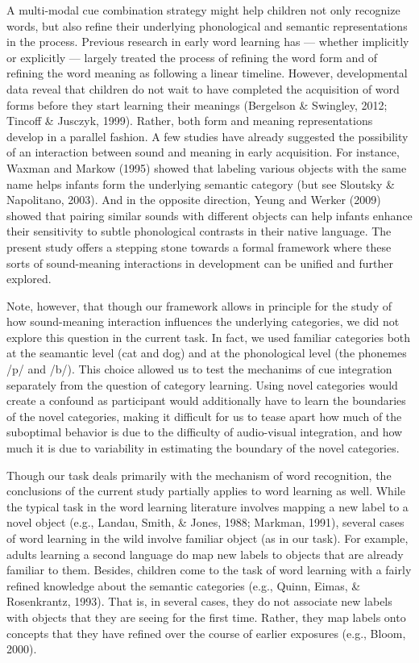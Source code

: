 \documentclass[english,,man,floatsintext]{apa6}
\theoremstyle{definition}
\theoremstyle{definition}
\theoremstyle{definition}
\theoremstyle{remark}
\begin{document}
A multi-modal cue combination strategy might help children not only
recognize words, but also refine their underlying phonological and
semantic representations in the process. Previous research in early word
learning has --- whether implicitly or explicitly --- largely treated
the process of refining the word form and of refining the word meaning
as following a linear timeline. However, developmental data reveal that
children do not wait to have completed the acquisition of word forms
before they start learning their meanings (Bergelson \& Swingley, 2012;
Tincoff \& Jusczyk, 1999). Rather, both form and meaning representations
develop in a parallel fashion. A few studies have already suggested the
possibility of an interaction between sound and meaning in early
acquisition. For instance, Waxman and Markow (1995) showed that labeling
various objects with the same name helps infants form the underlying
semantic category (but see Sloutsky \& Napolitano, 2003). And in the
opposite direction, Yeung and Werker (2009) showed that pairing similar
sounds with different objects can help infants enhance their sensitivity
to subtle phonological contrasts in their native language. The present
study offers a stepping stone towards a formal framework where these
sorts of sound-meaning interactions in development can be unified and
further explored.

Note, however, that though our framework allows in principle for the
study of how sound-meaning interaction influences the underlying
categories, we did not explore this question in the current task. In
fact, we used familiar categories both at the seamantic level (cat and
dog) and at the phonological level (the phonemes /p/ and /b/). This
choice allowed us to test the mechanims of cue integration separately
from the question of category learning. Using novel categories would
create a confound as participant would additionally have to learn the
boundaries of the novel categories, making it difficult for us to tease
apart how much of the suboptimal behavior is due to the difficulty of
audio-visual integration, and how much it is due to variability in
estimating the boundary of the novel categories.

Though our task deals primarily with the mechanism of word recognition,
the conclusions of the current study partially applies to word learning
as well. While the typical task in the word learning literature involves
mapping a new label to a novel object (e.g., Landau, Smith, \& Jones,
1988; Markman, 1991), several cases of word learning in the wild involve
familiar object (as in our task). For example, adults learning a second
language do map new labels to objects that are already familiar to them.
Besides, children come to the task of word learning with a fairly
refined knowledge about the semantic categories (e.g., Quinn, Eimas, \&
Rosenkrantz, 1993). That is, in several cases, they do not associate new
labels with objects that they are seeing for the first time. Rather,
they map labels onto concepts that they have refined over the course of
earlier exposures (e.g., Bloom, 2000).
\end{document}
